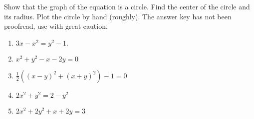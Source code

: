 Show that the graph of the equation is a circle. Find the center of the circle and its radius. Plot the circle by hand (roughly). The answer key has not been proofread, use with great caution.

\begin{enumerate}
\item 
$
3x-x^{2}= y^2-1.
$

\item 
$
x^2+y^2-x-2y=0
$

\answer{ }
\item $\frac{1}{2}\left((x-y)^2 + (x+y)^2\right) -1=0   $

\answer{}
\item $ 2x^2+y^2=2-y^2   $

\answer{}
\item $ 2x^2+2y^2+x+2y=3$

\answer{}
\end{enumerate}
